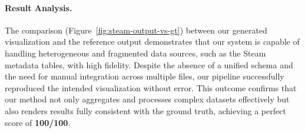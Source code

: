 \paragraph{Result Analysis.}
The comparison (Figure~\ref{fig:steam-output-vs-gt}) between our generated visualization and the reference output demonstrates that 
our system is capable of handling heterogeneous and fragmented data sources, such as the Steam 
metadata tables, with high fidelity. Despite the absence of a unified schema and the need for 
manual integration across multiple files, our pipeline successfully reproduced the intended 
visualization without error. This outcome confirms that our method not only aggregates and 
processes complex datasets effectively but also renders results fully consistent with the 
ground truth, achieving a perfect score of \textbf{100/100}.


